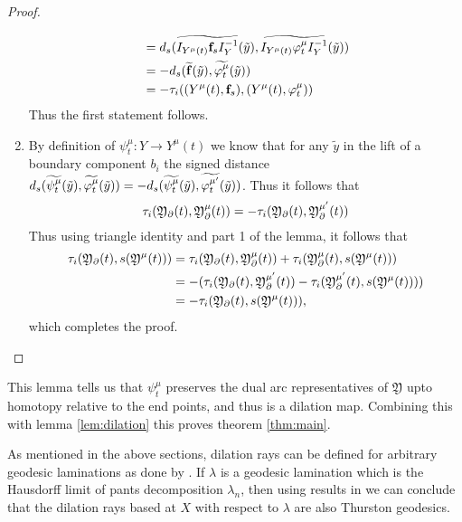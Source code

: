 \begin{proof}
\begin{enumerate}
\begin{align*}
                                                     &=d_s(\widetilde{I_{Y^\mu(t)}\mathbf{f}_sI^{-1}_Y}(\tilde{y}), \widetilde{I_{Y^\mu(t)}\varphi^{\mu}_tI^{-1}_{Y}}(\tilde{y}))\\
                                                     &=-d_s(\widetilde{\mathbf{f}}(\tilde{y}), \widetilde{\varphi^\mu_t}(\tilde{y}))\\
                                                     &= -\tau_i((Y^\mu(t), \mathbf{f}_s),(Y^{\mu}(t),\varphi^{\mu}_t))
      \end{align*}
      Thus the first statement follows.
    \item By definition of $\psi^\mu_t:Y\to Y^\mu(t)$ we know that for any $\tilde{y}$ in the lift of a boundary component $b_i$ the signed distance $d_s(\widetilde{\psi^\mu_t}(\tilde{y}), \widetilde{\varphi^\mu_t}(\tilde{y})) =-d_s(\widetilde{\psi^\mu_t}(\tilde{y}), \widetilde{\varphi^{\mu'}_t}(\tilde{y}))$. Thus it follows that 
      $$\tau_i( \mathfrak{Y}_\partial(t), \mathfrak{Y}_\partial^\mu(t)) = -\tau_i( \mathfrak{Y}_\partial(t), \mathfrak{Y}_\partial^{\mu'}(t))$$
  Thus using triangle identity and part 1 of the lemma, it follows that
  \begin{align*}
    \tau_i( \mathfrak{Y}_\partial(t), s( \mathfrak{Y}^\mu(t))) &= \tau_i( \mathfrak{Y}_\partial(t), \mathfrak{Y}_\partial^\mu(t)) + \tau_i(\mathfrak{Y}^\mu_\partial(t), s(\mathfrak{Y}^\mu(t)))\\
        &= - (\tau_i( \mathfrak{Y}_\partial(t), \mathfrak{Y}_\partial^{\mu'}(t)) - \tau_i(\mathfrak{Y}^{\mu'}_\partial(t), s(\mathfrak{Y}^{\mu}(t)))) \\
        &= - \tau_i( \mathfrak{Y}_\partial(t), s( \mathfrak{Y}^\mu(t))),
  \end{align*}
  which completes the proof.
  \end{enumerate}
\end{proof}
This lemma tells us that $\psi^\mu_t$ preserves the dual arc representatives of $ \mathfrak{Y}$ upto homotopy relative to the end points, and thus is a dilation map. Combining this with lemma \ref{lem:dilation} this proves theorem \ref{thm:main}.
\begin{rem}
  As mentioned in the above sections, dilation rays can be defined for arbitrary geodesic laminations as done by \cite{farre}. If $\lambda$ is a geodesic lamination which is the Hausdorff limit of pants decomposition $\lambda_n$, then using results in \cite{farre2} we can conclude that the dilation rays based at $X$ with respect to $\lambda$ are also Thurston geodesics.
\end{rem}
